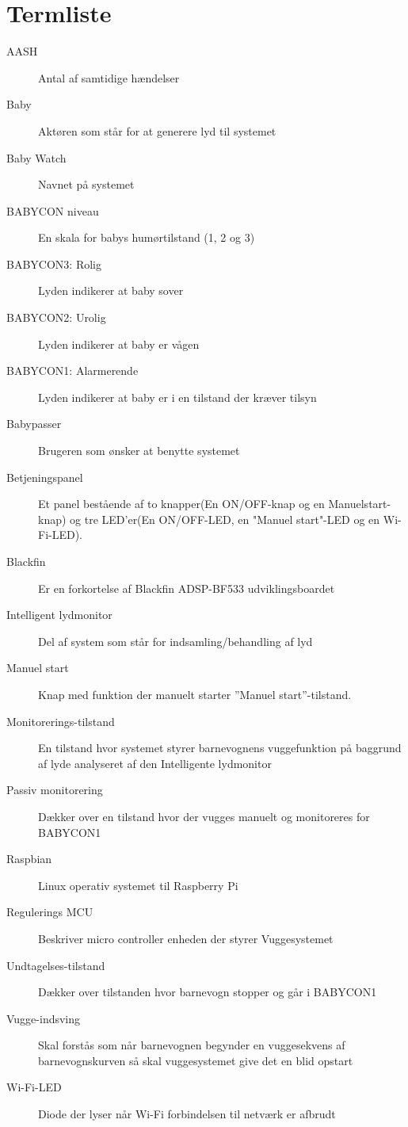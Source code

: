 \chapter{Termliste}


\begin{description}
\item[AASH] Antal af samtidige hændelser
\item[Baby] Aktøren som står for at generere lyd til systemet
\item[Baby Watch] Navnet på systemet
\item[BABYCON niveau] En skala for babys humørtilstand (1, 2 og 3)
\item[BABYCON3: Rolig] Lyden indikerer at baby sover
\item[BABYCON2: Urolig] Lyden indikerer at baby er vågen
\item[BABYCON1: Alarmerende] Lyden indikerer at baby er i en tilstand der kræver tilsyn
\item[Babypasser] Brugeren som ønsker at benytte systemet
\item[Betjeningspanel]Et panel bestående af to knapper(En ON/OFF-knap og en Manuelstart-knap) og tre LED'er(En ON/OFF-LED, en "Manuel start"-LED og en Wi-Fi-LED).
\item[Blackfin] Er en forkortelse af Blackfin ADSP-BF533 udviklingsboardet
\item[Intelligent lydmonitor] Del af system som står for indsamling/behandling af lyd
\item[Manuel start] Knap med funktion der manuelt starter ''Manuel start''-tilstand.
\item[Monitorerings-tilstand] En tilstand hvor systemet styrer barnevognens vuggefunktion på baggrund af lyde analyseret af den Intelligente lydmonitor
\item[Passiv monitorering] Dækker over en tilstand hvor der vugges manuelt og monitoreres for BABYCON1
\item[Raspbian] Linux operativ systemet til Raspberry Pi 
\item[Regulerings MCU] Beskriver micro controller enheden der styrer Vuggesystemet
\item[Undtagelses-tilstand] Dækker over tilstanden hvor barnevogn stopper og går i BABYCON1
\item[Vugge-indsving] Skal forstås som når barnevognen begynder en vuggesekvens af barnevognskurven så skal vuggesystemet give det en blid opstart
\item[Wi-Fi-LED]Diode der lyser når Wi-Fi forbindelsen til netværk er afbrudt

\end{description}